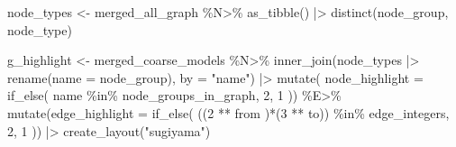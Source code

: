 \documentclass[
  letterpaper,
  DIV=11,
  numbers=noendperiod]{scrartcl}
\newenvironment{Shaded}{\begin{snugshade}}{\end{snugshade}}
\newcommand{\AttributeTok}[1]{\textcolor[rgb]{0.40,0.45,0.13}{#1}}
\newcommand{\DecValTok}[1]{\textcolor[rgb]{0.68,0.00,0.00}{#1}}
\newcommand{\FunctionTok}[1]{\textcolor[rgb]{0.28,0.35,0.67}{#1}}
\newcommand{\NormalTok}[1]{\textcolor[rgb]{0.00,0.23,0.31}{#1}}
\newcommand{\OtherTok}[1]{\textcolor[rgb]{0.00,0.23,0.31}{#1}}
\newcommand{\SpecialCharTok}[1]{\textcolor[rgb]{0.37,0.37,0.37}{#1}}
\newcommand{\StringTok}[1]{\textcolor[rgb]{0.13,0.47,0.30}{#1}}
\begin{document}
\begin{Shaded}
\begin{Highlighting}[]
\NormalTok{    node\_types }\OtherTok{\textless{}{-}}\NormalTok{ merged\_all\_graph }\SpecialCharTok{\%N\textgreater{}\%}
        \FunctionTok{as\_tibble}\NormalTok{() }\SpecialCharTok{|\textgreater{}} 
        \FunctionTok{distinct}\NormalTok{(node\_group, node\_type) }
    
\NormalTok{    g\_highlight }\OtherTok{\textless{}{-}}\NormalTok{ merged\_coarse\_models }\SpecialCharTok{\%N\textgreater{}\%}
        \FunctionTok{inner\_join}\NormalTok{(node\_types }\SpecialCharTok{|\textgreater{}} \FunctionTok{rename}\NormalTok{(}\AttributeTok{name =}\NormalTok{ node\_group),}
                   \AttributeTok{by =} \StringTok{"name"}\NormalTok{) }\SpecialCharTok{|\textgreater{}}
        \FunctionTok{mutate}\NormalTok{(}
            \AttributeTok{node\_highlight =} \FunctionTok{if\_else}\NormalTok{(}
\NormalTok{                name }\SpecialCharTok{\%in\%}\NormalTok{ node\_groups\_in\_graph, }\DecValTok{2}\NormalTok{, }\DecValTok{1}
\NormalTok{            )) }\SpecialCharTok{\%E\textgreater{}\%}
        \FunctionTok{mutate}\NormalTok{(}\AttributeTok{edge\_highlight =} \FunctionTok{if\_else}\NormalTok{(}
\NormalTok{            ((}\DecValTok{2} \SpecialCharTok{**}\NormalTok{ from )}\SpecialCharTok{*}\NormalTok{(}\DecValTok{3} \SpecialCharTok{**}\NormalTok{ to)) }\SpecialCharTok{\%in\%}\NormalTok{ edge\_integers, }\DecValTok{2}\NormalTok{, }\DecValTok{1}
\NormalTok{        )) }\SpecialCharTok{|\textgreater{}} 
        \FunctionTok{create\_layout}\NormalTok{(}\StringTok{"sugiyama"}\NormalTok{)}
    

\end{Highlighting}
\end{Shaded}
\end{document}
